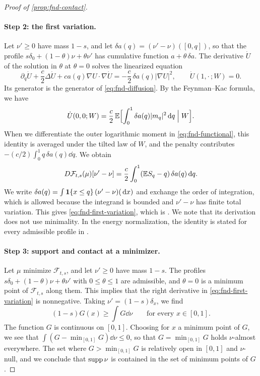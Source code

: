 \begin{proof}[Proof of \cref{prop:fnd-contact}]
\paragraph{Step 2: the first variation.}
Let $\nu'\ge0$ have mass $1-s$, and let
$\delta a(q)=(\nu'-\nu)([0,q])$, so that the profile
$s\delta_0+(1-\theta)\nu+\theta\nu'$ has cumulative function
$a+\theta\,\delta a$. The derivative $\dot U$ of the solution in
$\theta$ at $\theta=0$ solves the linearized equation
\[
 \partial_q\dot U+\frac c2\Delta\dot U+ca(q)\nabla U\cdot\nabla\dot U
 =-\frac c2\,\delta a(q)|\nabla U|^2,\qquad \dot U(1,\cdot\,;W)=0 .
\]
Its generator is the generator of \eqref{eq:fnd-diffusion}. By the
Feynman--Kac formula, we have
\[
 \dot U(0,0;W)=\frac c2\,\mathbb E\Bigl[\int_0^1\delta a(q)|m_q|^2\,\mathrm d q
 \Bigm|W\Bigr].
\]
When we differentiate the outer logarithmic moment in
\eqref{eq:fnd-functional}, this identity is averaged under the tilted law
of $W$, and the penalty
contributes $-(c/2)\int_0^1q\,\delta a(q)\dd q$. We obtain
\[
 D\mathcal F_{t,s}(\mu)[\nu'-\nu]
 =\frac c2\int_0^1(\mathbb E S_q-q)\,\delta a(q)\,\mathrm d q .
\]
We write $\delta a(q)=\int\mathbf1\{x\le q\}\,(\nu'-\nu)(\,\mathrm d x)$ and
exchange the order of integration, which is allowed because the
integrand is bounded and $\nu'-\nu$ has finite total variation. This
gives \eqref{eq:fnd-first-variation}, which is \cite[(2.8)]{AL}. We note
that its derivation does not use minimality. In the energy
normalization, the
identity is stated for every admissible profile in
\cite[Section~7.4, (7.22)]{AL}.

\paragraph{Step 3: support and contact at a minimizer.}
Let $\mu$ minimize $\mathcal F_{t,s}$, and let $\nu'\ge0$ have mass
$1-s$. The profiles $s\delta_0+(1-\theta)\nu+\theta\nu'$ with
$0\le\theta\le1$ are admissible, and $\theta=0$ is a minimum point of
$\mathcal F_{t,s}$ along them. This implies that the right derivative in
\eqref{eq:fnd-first-variation} is nonnegative. Taking
$\nu'=(1-s)\delta_x$, we find
\[
 (1-s)G(x)\ge\int G\dd\nu\qquad\text{for every }x\in[0,1].
\]
The function $G$ is continuous on $[0,1]$. Choosing for $x$ a minimum
point of $G$, we see that $\int(G-\min_{[0,1]}G)\dd\nu\le0$, so that
$G=\min_{[0,1]}G$ holds $\nu$-almost everywhere. The set where
$G>\min_{[0,1]}G$ is relatively open in $[0,1]$ and $\nu$-null, and we
conclude that $\operatorname{supp}\nu$ is contained in the set of minimum points of
$G$.


\end{proof}
